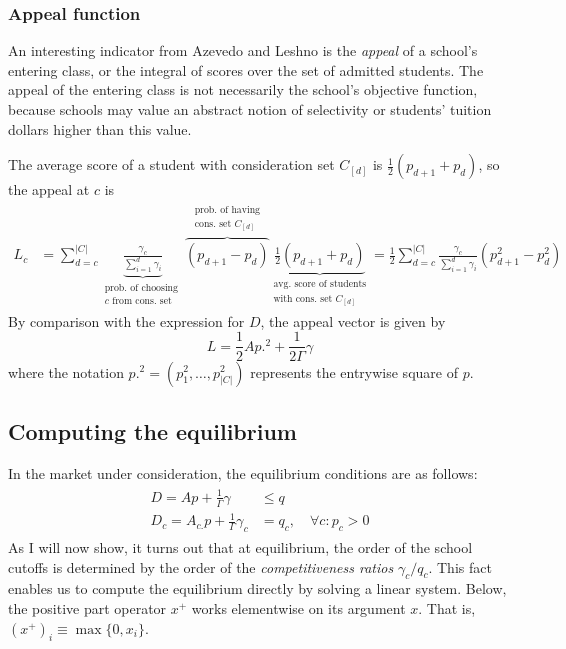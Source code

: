 \documentclass[12pt]{article}
\theoremstyle{definition}
\begin{document}
\subsubsection{Appeal function}
An interesting indicator from Azevedo and Leshno \parencite*{supplydemandfw} is the \emph{appeal} of a school's entering class, or the integral of scores over the set of admitted students. The appeal of the entering class is not necessarily the school's objective function, because schools may value an abstract notion of selectivity or students' tuition dollars higher than this value. 

The average score of a student with consideration set $C_{[d]}$ is $\frac{1}{2}\left(p_{d+1} + p_d\right)$, so the appeal at $c$ is
\begin{align}
L_c &= \sum_{d=c}^{|C|} 
\underbrace{\frac{{\gamma_c}}{ \sum_{i=1}^d {\gamma_i}}}_{\substack{\text{prob. of choosing  }\\ c\text{ from cons. set}}} 
\overbrace{\left(p_{d+1} - p_{d}\right)}^{\substack{\text{prob. of having}\\ \text{cons. set }C_{[d]}}} 
\underbrace{\frac{1}{2}\left(p_{d+1} + p_{d}\right)}_{\substack{\text{avg. score of students}\\ \text{with cons. set }C_{[d]}}}
=\frac{1}{2}\sum_{d=c}^{|C|} 
\frac{{\gamma_c}}{ \sum_{i=1}^d {\gamma_i}} 
\left(p_{d+1}^2 -  p_{d}^2\right)
\end{align}
By comparison with the expression for $D$, the appeal vector is given by 
\[L = \frac{1}{2} A p.^2 + \frac{1}{2\Gamma} \gamma\]
where the notation $p.^2 = (p_1^2, \dots, p_{|C|}^2)$ represents the entrywise square of $p$.




\subsection{Computing the equilibrium}
In the market under consideration, the equilibrium conditions are as follows:
\begin{gather} \label{ssmnleqconds}
\begin{aligned}
D = A p + \frac{1}{\Gamma}\gamma &\leq q \\
D_c = A_{c.} p + \frac{1}{\Gamma} \gamma_c &= q_c, \quad \forall c: p_c > 0
\end{aligned}
\end{gather}
As I will now show, it turns out that at equilibrium, the order of the school cutoffs is determined by the order of the \emph{competitiveness ratios} $\gamma_c / q_c$. This fact enables us to compute the equilibrium directly by solving a linear system. Below, the positive part operator $x^+$ works elementwise on its argument $x$. That is, $(x^+)_i \equiv \max\{0, x_i\}$.
\end{document}
